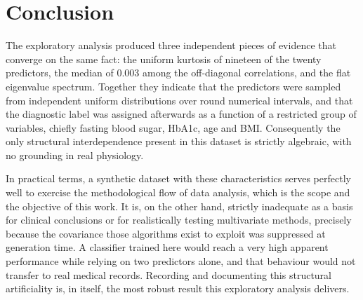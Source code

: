\documentclass[conference]{IEEEtran}
\begin{document}
\section{Conclusion}
\label{sec:conclusion}

The exploratory analysis produced three independent pieces of evidence
that converge on the same fact: the uniform kurtosis of nineteen of
the twenty predictors, the median of $0.003$ among the off-diagonal
correlations, and the flat eigenvalue spectrum. Together they indicate
that the predictors were sampled from independent uniform
distributions over round numerical intervals, and that the diagnostic
label was assigned afterwards as a function of a restricted group of
variables, chiefly fasting blood sugar, HbA1c, age and BMI.
Consequently the only structural interdependence present in this
dataset is strictly algebraic, with no grounding in real physiology.

In practical terms, a synthetic dataset with these characteristics
serves perfectly well to exercise the methodological flow of data
analysis, which is the scope and the objective of this work. It is,
on the other hand, strictly inadequate as a basis for clinical
conclusions or for realistically testing multivariate methods,
precisely because the covariance those algorithms exist to exploit was
suppressed at generation time. A classifier trained here would reach a
very high apparent performance while relying on two predictors alone,
and that behaviour would not transfer to real medical records.
Recording and documenting this structural artificiality is, in itself,
the most robust result this exploratory analysis delivers.



\end{document}
